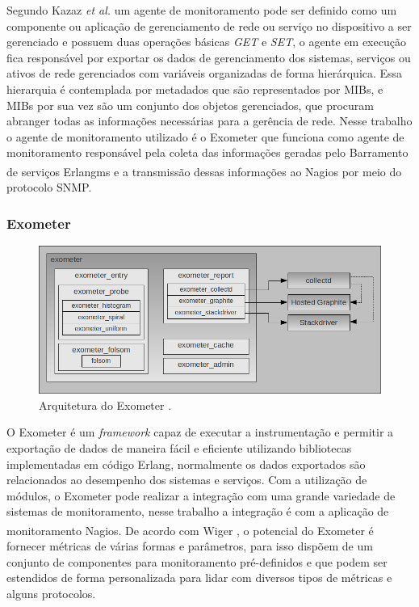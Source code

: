  Segundo Kazaz \textit{et al.}  \cite{6240708} um agente de monitoramento pode ser definido como um componente ou aplicação de gerenciamento de rede ou serviço no dispositivo a ser gerenciado e possuem duas operações básicas \textit{GET} e \textit{SET}, o agente em execução fica responsável por exportar os dados de gerenciamento dos sistemas, serviços ou ativos de rede gerenciados com variáveis organizadas de forma hierárquica. Essa hierarquia é contemplada por metadados que são representados por \acrshort{MIBs}, e \acrshort{MIBs} por sua vez são um conjunto dos objetos gerenciados, que procuram abranger todas as informações necessárias para a gerência de rede. Nesse trabalho o agente de monitoramento utilizado é o Exometer que funciona como agente de monitoramento responsável pela coleta das informações geradas pelo Barramento de serviços Erlangms e a transmissão dessas informações ao Nagios\textsuperscript{\textregistered} por meio do protocolo \acrshort{SNMP}. 


\subsubsection{Exometer}

\begin{figure}[H]
	\begin{center}
	\includegraphics[scale = 0.60]{img/exometer_overview.png}
		\caption{Arquitetura do Exometer \cite{exometer_core}.}
		\label{fun:fig:zabbix}
	\end{center}
\end{figure}
O Exometer é um \textit{framework} capaz de executar a instrumentação e permitir a exportação de dados de maneira fácil e eficiente utilizando bibliotecas implementadas em código Erlang, normalmente os dados exportados são relacionados ao desempenho dos sistemas e serviços. Com a utilização de módulos, o Exometer pode realizar a integração com uma grande variedade de sistemas de monitoramento, nesse trabalho a integração é com a aplicação de monitoramento Nagios\textsuperscript{\textregistered}. De acordo com Wiger \cite{exometer_core}, o potencial do Exometer é fornecer métricas de várias formas e parâmetros, para isso dispõem de um conjunto de componentes para monitoramento pré-definidos e que podem ser estendidos de forma personalizada para lidar com diversos tipos de métricas e alguns protocolos.

